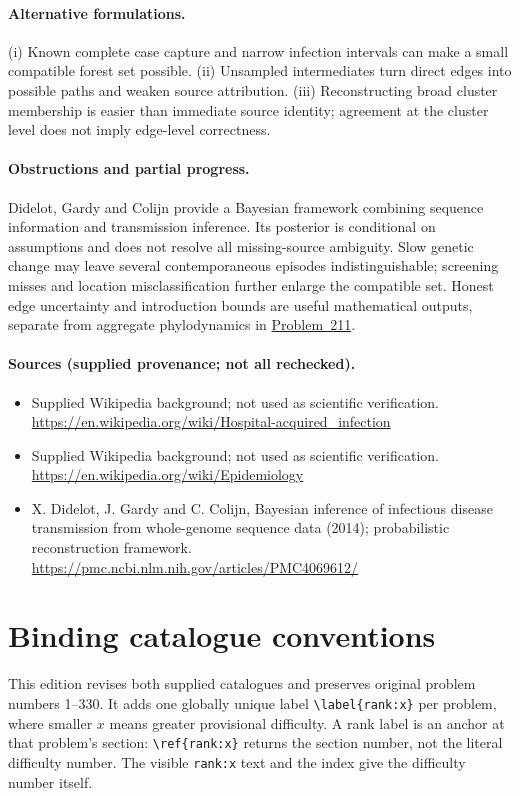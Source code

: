 \documentclass[11pt]{article}
\begin{document}
\paragraph{Alternative formulations.} (i) Known complete case capture and narrow infection intervals can make a small compatible forest set possible. (ii) Unsampled intermediates turn direct edges into possible paths and weaken source attribution. (iii) Reconstructing broad cluster membership is easier than immediate source identity; agreement at the cluster level does not imply edge-level correctness.
\paragraph{Obstructions and partial progress.} Didelot, Gardy and Colijn provide a Bayesian framework combining sequence information and transmission inference. Its posterior is conditional on assumptions and does not resolve all missing-source ambiguity. Slow genetic change may leave several contemporaneous episodes indistinguishable; screening misses and location misclassification further enlarge the compatible set. Honest edge uncertainty and introduction bounds are useful mathematical outputs, separate from aggregate phylodynamics in \href{https://we-solve.github.io/problems/joint-phylodynamic-inference-a032c7f7/}{Problem~211}.
\paragraph{Sources (supplied provenance; not all rechecked).}
\begin{itemize}
\item Supplied Wikipedia background; not used as scientific verification. \url{https://en.wikipedia.org/wiki/Hospital-acquired_infection}
\item Supplied Wikipedia background; not used as scientific verification. \url{https://en.wikipedia.org/wiki/Epidemiology}
\item X. Didelot, J. Gardy and C. Colijn, Bayesian inference of infectious disease transmission from whole-genome sequence data (2014); probabilistic reconstruction framework. \url{https://pmc.ncbi.nlm.nih.gov/articles/PMC4069612/}
\end{itemize}


\section*{Binding catalogue conventions}
This edition revises both supplied catalogues and preserves original problem numbers 1--330. It adds one globally unique label \verb|\label{rank:x}| per problem, where smaller $x$ means greater provisional difficulty. A rank label is an anchor at that problem's section: \verb|\ref{rank:x}| returns the section number, not the literal difficulty number. The visible \texttt{rank:x} text and the index give the difficulty number itself.
\end{document}
